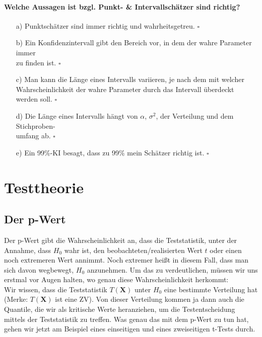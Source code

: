 \documentclass[a4paper]{article}
\begin{document}
\paragraph{Welche Aussagen ist bzgl. Punkt- \& Intervallschätzer sind richtig?}
\begin{itemize}
    \item[a)] Punktschätzer sind immer richtig und wahrheitsgetreu. \hfill $\square$
    \item[b)] Ein Konfidenzintervall gibt den Bereich vor, in dem der wahre Parameter immer \\zu finden ist. \hfill $\square$
    \item[c)] Man kann die Länge eines Intervalls variieren, je nach dem mit welcher\\ Wahrscheinlichkeit der wahre Parameter durch das Intervall überdeckt werden soll. \hfill $\square$
    \item[d)] Die Länge eines Intervalls hängt von $\alpha$, $\sigma^2$, der Verteilung und dem Stichproben-\\umfang ab. \hfill $\square$
    \item[e)] Ein 99$\%$-KI besagt, dass zu 99$\%$ mein Schätzer richtig ist. \hfill $\square$
\end{itemize}


\clearpage


\section{Testtheorie}\label{sec:Tests}

\subsection{Der p-Wert}\label{sec:pWert}

Der p-Wert gibt die Wahrscheinlichkeit an, dass die Teststatistik, unter der Annahme, dass $H_0$ wahr ist, den beobachteten/realisierten Wert $t$ oder einen noch extremeren Wert annimmt. Noch extremer heißt in diesem Fall, dass man sich davon wegbewegt, $H_0$ anzunehmen. Um das zu verdeutlichen, müssen wir uns erstmal vor Augen halten, wo genau diese Wahrscheinlichkeit herkommt: \\

\noindent Wir wissen, dass die Teststatistik $T(\textbf{X})$ unter $H_0$ eine bestimmte Verteilung hat (Merke: $T(\textbf{X})$ ist eine ZV). Von dieser Verteilung kommen ja dann auch die Quantile, die wir als kritische Werte heranziehen, um die Testentscheidung mittels der Teststatistik zu treffen. Was genau das mit dem p-Wert zu tun hat, gehen wir jetzt am Beispiel eines einseitigen und eines zweiseitigen t-Tests durch.
\end{document}
